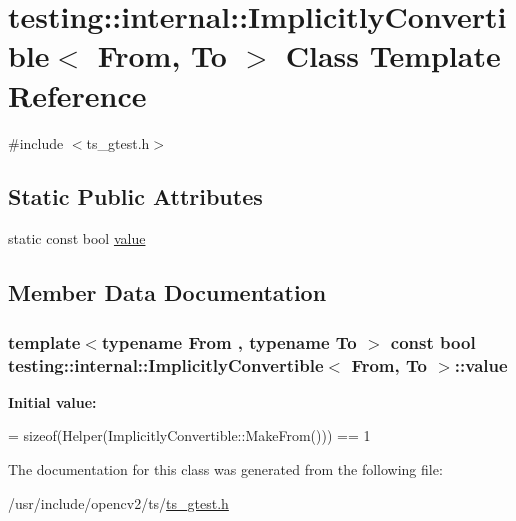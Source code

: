 \hypertarget{classtesting_1_1internal_1_1ImplicitlyConvertible}{\section{testing\-:\-:internal\-:\-:Implicitly\-Convertible$<$ From, To $>$ Class Template Reference}
\label{classtesting_1_1internal_1_1ImplicitlyConvertible}
}


{\ttfamily \#include $<$ts\-\_\-gtest.\-h$>$}

\subsection*{Static Public Attributes}
\begin{DoxyCompactItemize}
\item 
static const bool \hyperlink{classtesting_1_1internal_1_1ImplicitlyConvertible_aea51cecabca681fb75659e224771b7b7}{value}
\end{DoxyCompactItemize}


\subsection{Member Data Documentation}
\hypertarget{classtesting_1_1internal_1_1ImplicitlyConvertible_aea51cecabca681fb75659e224771b7b7}{
\subsubsection[{value}]{\setlength{\rightskip}{0pt plus 5cm}template$<$typename From , typename To $>$ const bool {\bf testing\-::internal\-::\-Implicitly\-Convertible}$<$ From, To $>$\-::value\hspace{0.3cm}{\ttfamily [static]}}}\label{classtesting_1_1internal_1_1ImplicitlyConvertible_aea51cecabca681fb75659e224771b7b7}
{\bfseries Initial value\-:}
\begin{DoxyCode}
=
      \textcolor{keyword}{sizeof}(Helper(ImplicitlyConvertible::MakeFrom())) == 1
\end{DoxyCode}


The documentation for this class was generated from the following file\-:\begin{DoxyCompactItemize}
\item 
/usr/include/opencv2/ts/\hyperlink{ts__gtest_8h}{ts\-\_\-gtest.\-h}\end{DoxyCompactItemize}
